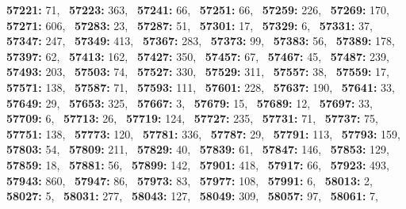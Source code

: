 \textbf{57221:} 71,\allowbreak~ 
\textbf{57223:} 363,\allowbreak~ 
\textbf{57241:} 66,\allowbreak~ 
\textbf{57251:} 66,\allowbreak~ 
\textbf{57259:} 226,\allowbreak~ 
\textbf{57269:} 170,\allowbreak~ 
\textbf{57271:} 606,\allowbreak~ 
\textbf{57283:} 23,\allowbreak~ 
\textbf{57287:} 51,\allowbreak~ 
\textbf{57301:} 17,\allowbreak~ 
\textbf{57329:} 6,\allowbreak~ 
\textbf{57331:} 37,\allowbreak~ 
\textbf{57347:} 247,\allowbreak~ 
\textbf{57349:} 413,\allowbreak~ 
\textbf{57367:} 283,\allowbreak~ 
\textbf{57373:} 99,\allowbreak~ 
\textbf{57383:} 56,\allowbreak~ 
\textbf{57389:} 178,\allowbreak~ 
\textbf{57397:} 62,\allowbreak~ 
\textbf{57413:} 162,\allowbreak~ 
\textbf{57427:} 350,\allowbreak~ 
\textbf{57457:} 67,\allowbreak~ 
\textbf{57467:} 45,\allowbreak~ 
\textbf{57487:} 239,\allowbreak~ 
\textbf{57493:} 203,\allowbreak~ 
\textbf{57503:} 74,\allowbreak~ 
\textbf{57527:} 330,\allowbreak~ 
\textbf{57529:} 311,\allowbreak~ 
\textbf{57557:} 38,\allowbreak~ 
\textbf{57559:} 17,\allowbreak~ 
\textbf{57571:} 138,\allowbreak~ 
\textbf{57587:} 71,\allowbreak~ 
\textbf{57593:} 111,\allowbreak~ 
\textbf{57601:} 228,\allowbreak~ 
\textbf{57637:} 190,\allowbreak~ 
\textbf{57641:} 33,\allowbreak~ 
\textbf{57649:} 29,\allowbreak~ 
\textbf{57653:} 325,\allowbreak~ 
\textbf{57667:} 3,\allowbreak~ 
\textbf{57679:} 15,\allowbreak~ 
\textbf{57689:} 12,\allowbreak~ 
\textbf{57697:} 33,\allowbreak~ 
\textbf{57709:} 6,\allowbreak~ 
\textbf{57713:} 26,\allowbreak~ 
\textbf{57719:} 124,\allowbreak~ 
\textbf{57727:} 235,\allowbreak~ 
\textbf{57731:} 71,\allowbreak~ 
\textbf{57737:} 75,\allowbreak~ 
\textbf{57751:} 138,\allowbreak~ 
\textbf{57773:} 120,\allowbreak~ 
\textbf{57781:} 336,\allowbreak~ 
\textbf{57787:} 29,\allowbreak~ 
\textbf{57791:} 113,\allowbreak~ 
\textbf{57793:} 159,\allowbreak~ 
\textbf{57803:} 54,\allowbreak~ 
\textbf{57809:} 211,\allowbreak~ 
\textbf{57829:} 40,\allowbreak~ 
\textbf{57839:} 61,\allowbreak~ 
\textbf{57847:} 146,\allowbreak~ 
\textbf{57853:} 129,\allowbreak~ 
\textbf{57859:} 18,\allowbreak~ 
\textbf{57881:} 56,\allowbreak~ 
\textbf{57899:} 142,\allowbreak~ 
\textbf{57901:} 418,\allowbreak~ 
\textbf{57917:} 66,\allowbreak~ 
\textbf{57923:} 493,\allowbreak~ 
\textbf{57943:} 860,\allowbreak~ 
\textbf{57947:} 86,\allowbreak~ 
\textbf{57973:} 83,\allowbreak~ 
\textbf{57977:} 108,\allowbreak~ 
\textbf{57991:} 6,\allowbreak~ 
\textbf{58013:} 2,\allowbreak~ 
\textbf{58027:} 5,\allowbreak~ 
\textbf{58031:} 277,\allowbreak~ 
\textbf{58043:} 127,\allowbreak~ 
\textbf{58049:} 309,\allowbreak~ 
\textbf{58057:} 97,\allowbreak~ 
\textbf{58061:} 7,\allowbreak~ 
